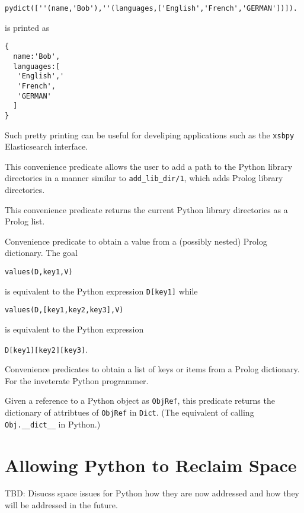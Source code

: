 \begin{description}
\begin{verbatim}
pydict([''(name,'Bob'),''(languages,['English','French','GERMAN'])]).
\end{verbatim}

\noindent
is printed as 
\begin{verbatim}
{
  name:'Bob',
  languages:[
   'English','
   'French',
   'GERMAN'
  ]
} 
\end{verbatim}

Such pretty printing can be useful for develiping applications such as
the {\tt xsbpy} Elasticsearch interface.

%
This convenience predicate allows the user to add a path to the Python
library directories in a manner similar to {\tt add\_lib\_dir/1},
which adds Prolog library directories.

%
This convenience predicate returns the current Python library
directories as a Prolog list.

%
  Convenience predicate to obtain a value from a (possibly nested)
  Prolog dictionary.  The goal

  {\tt values(D,key1,V)}

\noindent
  is equivalent to the
  Python expression {\tt D[key1]} while

  {\tt values(D,[key1,key2,key3],V)}

\noindent
is equivalent to the Python expression

{\tt D[key1][key2][key3]}.

%
Convenience predicates to obtain a list of keys or items from a Prolog
dictionary.  For the inveterate Python programmer.

%
Given a reference to a Python object as {\tt ObjRef}, this predicate
returns the dictionary of attribtues of {\tt ObjRef} in {\tt Dict}.
(The equivalent of calling {\tt Obj.\_\_dict\_\_} in Python.)

\end{description}

\section{Allowing Python to Reclaim Space}
%
TBD: Disucss space issues for Python how they are now addressed and
how they will be addressed in the future.

